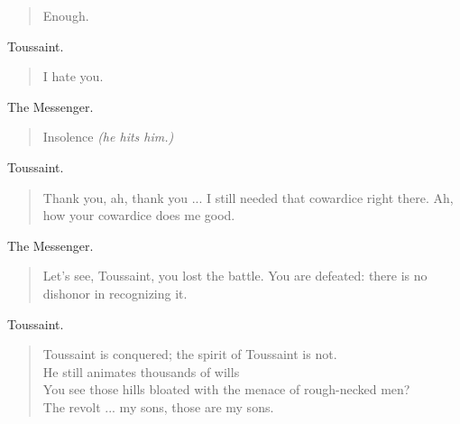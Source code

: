 \documentclass[letterpaper,article,12pt,oneside,notitlepage]{memoir}
\begin{document}
\begin{verse}
\hspace{1cm} Enough. \\
\end{verse}

\begin{center}Toussaint.\end{center}

\begin{verse}
\hspace{1cm} I hate you. \\
\end{verse}

\begin{center}The Messenger.\end{center}

\begin{verse}
\hspace{1cm} Insolence \textit{(he hits him.)} \\
\end{verse}

\begin{center}Toussaint.\end{center}

\begin{verse}
\indent Thank you, ah, thank you ... I still needed that cowardice right there. Ah, how your cowardice does me good. \\
\end{verse}

\begin{center}The Messenger.\end{center}

\begin{verse}
Let's see, Toussaint, you lost the battle. You are defeated: there is no dishonor in recognizing it. \\
\end{verse}

\clearpage

\begin{center}Toussaint.\end{center}

\begin{verse}
Toussaint is conquered; the spirit of Toussaint is not. \\
He still animates thousands of wills \\
You see those hills bloated with the menace of rough-necked men? \\
The revolt ... my sons, those are my sons. \\
\end{verse}
\end{document}
